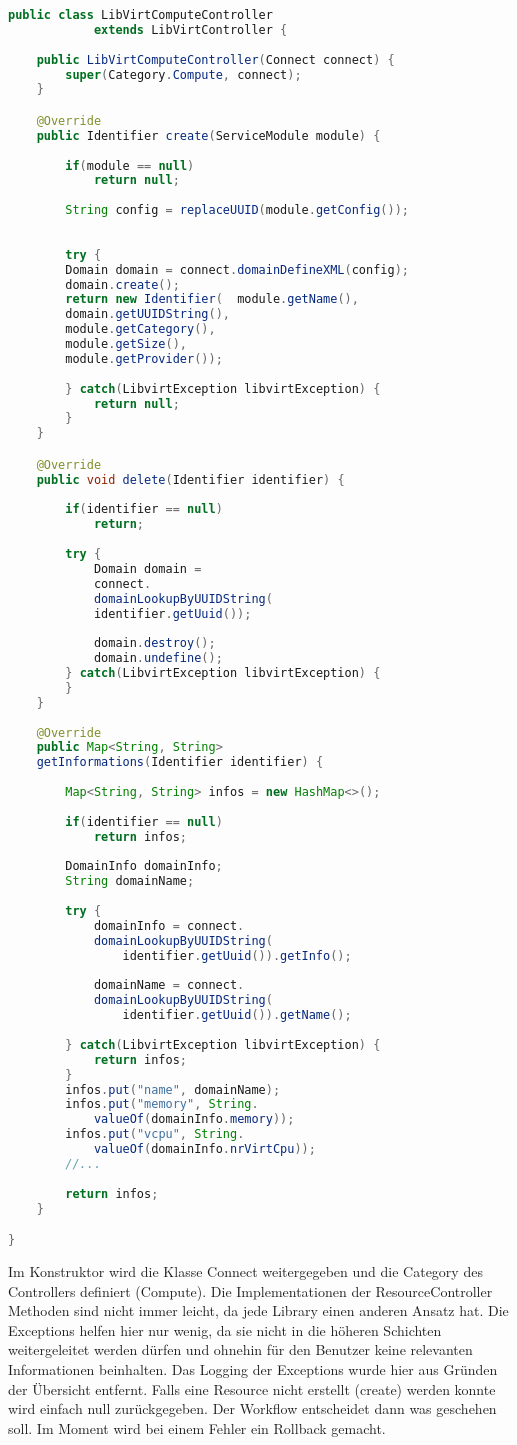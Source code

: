 \begin{lstlisting}[language=Java,frame=single,caption={LibVirtComputeController Code}] 
public class LibVirtComputeController 
			extends LibVirtController {
	
	public LibVirtComputeController(Connect connect) {
		super(Category.Compute, connect);
	}

	@Override
	public Identifier create(ServiceModule module) {
		
		if(module == null)
			return null;
		
		String config = replaceUUID(module.getConfig());
		
	
		try {
		Domain domain = connect.domainDefineXML(config);
		domain.create();
		return new Identifier(	module.getName(),
		domain.getUUIDString(), 
		module.getCategory(), 
		module.getSize(), 
		module.getProvider());
									
		} catch(LibvirtException libvirtException) {
			return null;
		}
	}

	@Override
	public void delete(Identifier identifier) {
		
		if(identifier == null)
			return;
		
		try {
			Domain domain = 
			connect.
			domainLookupByUUIDString(
			identifier.getUuid());
			
			domain.destroy();
			domain.undefine();
		} catch(LibvirtException libvirtException) {
		}
	}
	
	@Override
	public Map<String, String> 
	getInformations(Identifier identifier) {
		
		Map<String, String> infos = new HashMap<>();
		
		if(identifier == null)
			return infos;
		
		DomainInfo domainInfo;
		String domainName;
		
		try {
			domainInfo = connect.
			domainLookupByUUIDString(
				identifier.getUuid()).getInfo();
			
			domainName = connect.
			domainLookupByUUIDString(
				identifier.getUuid()).getName();
			
		} catch(LibvirtException libvirtException) {
			return infos;
		}
		infos.put("name", domainName);
		infos.put("memory", String.
			valueOf(domainInfo.memory));
		infos.put("vcpu", String.
			valueOf(domainInfo.nrVirtCpu));
		//...
		
		return infos;
	}

}
\end{lstlisting}
Im Konstruktor wird die Klasse Connect weitergegeben und die Category des 
Controllers definiert (Compute). Die Implementationen der ResourceController 
Methoden sind nicht immer leicht, da jede Library einen anderen Ansatz hat. 
Die Exceptions helfen hier nur wenig, da sie nicht in die höheren Schichten weitergeleitet werden 
dürfen und ohnehin für den Benutzer keine relevanten Informationen beinhalten. Das Logging der
 Exceptions wurde hier aus Gründen der Übersicht entfernt. Falls eine Resource nicht erstellt (create) 
 werden konnte wird einfach null zurückgegeben. Der Workflow entscheidet dann was geschehen soll. 
 Im Moment wird bei einem Fehler ein Rollback gemacht.

